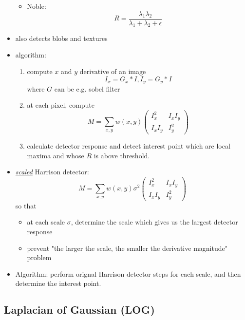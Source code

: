 \documentclass[twocolumn,landscape,10pt]{article}
\theoremstyle{definition}
\begin{document}
\begin{itemize}
\begin{itemize}
            \item Noble:
                \[
                    R = \frac{\lambda_1\lambda_2}{\lambda_1+\lambda_2+\epsilon}
                \]
        \end{itemize} 
    \item also detects blobs and textures
    \item algorithm:
        \begin{enumerate}
            \item compute $x$ and $y$ derivative of an image
                \[
                    I_x=G_x*I, I_y=G_y*I
                \]
                where $G$ can be e.g. sobel filter
            \item at each pixel, compute
                \[
                    M=\sum_{x,y}w(x,y)\begin{pmatrix}
                        I_x^2 & I_xI_y \\
                        I_xI_y & I_y^2
                    \end{pmatrix} 
                \]
            \item calculate detector response and detect interest point which
                are local maxima and whose $R$ is above threshold.
        \end{enumerate} 
    \item \underline{\emph{scaled}} Harrison detector:
        \[
            M = \sum_{x,y} w(x,y)\sigma^2
            \begin{pmatrix}
                I_x^2 & I_xI_y \\
                I_xI_y & I_y^2
            \end{pmatrix} 
        \]
        so that 
        \begin{itemize}
            \item at each scale $\sigma$, determine the scale which gives us the
                largest detector response
            \item prevent "the larger the scale, the smaller the derivative
                magnitude" problem
        \end{itemize} 
    \item Algorithm: perform orignal Harrison detector steps for each scale, and
        then determine the interest point.
\end{itemize} 

\subsection{Laplacian of Gaussian (LOG)}
\end{document}

